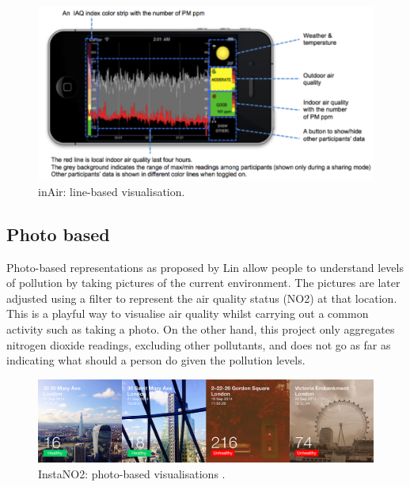 \begin{figure}[H]
\begin{adjustbox}{width=1\textwidth,center=\textwidth}
  \centering
  \includegraphics[scale=1]{images/InAir.png}
\end{adjustbox}
  \caption[inAir project: line-based visualisations]{inAir: line-based visualisation\cite{Kim2013}.}
  \label{fig:line_based_inAir}
\end{figure}


\subsection{Photo based}
Photo-based representations as proposed by Lin \cite{Lin2014} allow people to understand levels of pollution by taking pictures of the current environment. The pictures are later adjusted using a filter to represent the air quality status (NO2) at that location. This is a playful way to visualise air quality whilst carrying out a common activity such as taking a photo. On the other hand, this project only aggregates nitrogen dioxide readings, excluding other pollutants, and does not go as far as indicating what should a person do given the pollution levels.

\begin{figure}[H]
\begin{adjustbox}{width=.8\textwidth,center=\textwidth}
  \centering
  \includegraphics[scale=.4]{images/instaNO2.jpg}
\end{adjustbox}
  \caption[InstaNO2 project: photo-based visualisations]{InstaNO2: photo-based visualisations \cite{Lin2014}.}
  \label{fig:photo_based_instaNO2}
\end{figure}

